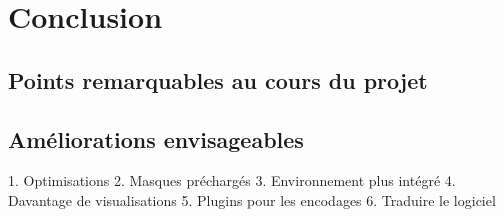 \documentclass[a4paper,11pt]{article}
\begin{document}
\section{Conclusion}
  \subsection{Points remarquables au cours du projet}
  \subsection{Améliorations envisageables}
    1. Optimisations
    2. Masques préchargés
    3. Environnement plus intégré
    4. Davantage de visualisations
    5. Plugins pour les encodages
    6. Traduire le logiciel

\end{document}
